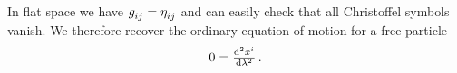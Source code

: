 In flat space we have $\tensor{g}{_i_j}=\tensor{\eta}{_i_j}$ and can easily
check that all Christoffel symbols vanish. We therefore recover the ordinary equation of motion for a free particle
\begin{equation}
    0 = \od[2]{\tensor{x}{^i}}{\lambda}\, .
\end{equation}

